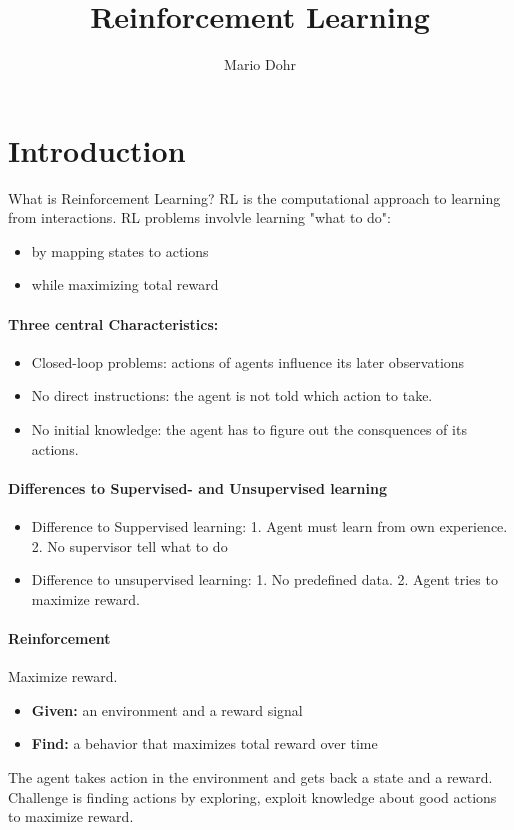 \documentclass[10pt,a4paper]{article}
\author{Mario Dohr}
\title{Reinforcement Learning}
\begin{document}
\section{Introduction}
What is Reinforcement Learning? RL is the computational approach to learning from interactions.
RL problems involvle learning "what to do":
\begin{itemize}
\item by mapping states to actions
\item while maximizing total reward
\end{itemize}

\paragraph{Three central Characteristics:}
\begin{itemize}
\item Closed-loop problems: actions of agents influence its later observations
\item No direct instructions: the agent is not told which action to take.
\item No initial knowledge: the agent has to figure out the consquences of its actions.
\end{itemize}

\paragraph{Differences to Supervised- and Unsupervised learning}
\begin{itemize}
\item Difference to Suppervised learning: 1. Agent must learn from own experience. 2. No supervisor tell what to do
\item Difference to unsupervised learning: 1. No predefined data. 2. Agent tries to maximize reward.
\end{itemize}

\paragraph{Reinforcement}
Maximize reward.
\begin{itemize}
\item \textbf{Given:} an environment and a reward signal
\item \textbf{Find:} a behavior that maximizes total reward over time
\end{itemize}
The agent takes action in the environment and gets back a state and a reward. Challenge is finding actions by exploring, exploit knowledge about good actions to maximize reward.
\end{document}
